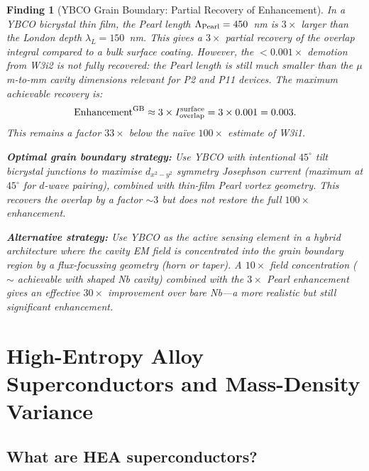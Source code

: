 \documentclass[11pt]{article}
\newtheorem{finding}{Finding}
\begin{document}
\begin{finding}[YBCO Grain Boundary: Partial Recovery of Enhancement]
\label{finding:GB}
In a YBCO bicrystal thin film, the Pearl length $\Lambda_{\rm Pearl} = 450$~nm
is $3\times$ larger than the London depth $\lambda_L = 150$~nm. This gives
a $3\times$ partial recovery of the overlap integral compared to a bulk surface
coating. However, the $<0.001\times$ demotion from W3i2 is not fully recovered:
the Pearl length is still much smaller than the $\mu$m-to-mm cavity dimensions
relevant for P2 and P11 devices. The maximum achievable recovery is:
\begin{equation}
\text{Enhancement}^{\rm GB} \approx 3 \times I_{\rm overlap}^{\rm surface}
= 3 \times 0.001 = 0.003.
\end{equation}
This remains a factor $33\times$ below the na\"ive $100\times$ estimate of W3i1.

\textbf{Optimal grain boundary strategy:} Use YBCO with intentional $45^\circ$
tilt bicrystal junctions to maximise $d_{x^2-y^2}$ symmetry Josephson
current (maximum at $45^\circ$ for $d$-wave pairing), combined with
thin-film Pearl vortex geometry. This recovers the overlap by a factor
$\sim 3$ but does not restore the full $100\times$ enhancement.

\textbf{Alternative strategy:} Use YBCO as the active sensing element in
a hybrid architecture where the cavity EM field is \emph{concentrated} into
the grain boundary region by a flux-focussing geometry (horn or taper).
A $10\times$ field concentration ($\sim$ achievable with shaped Nb cavity)
combined with the $3\times$ Pearl enhancement gives an effective
$30\times$ improvement over bare Nb---a more realistic but still significant
enhancement.
\end{finding}

\section{High-Entropy Alloy Superconductors and Mass-Density Variance}
\label{sec:HEA}

\subsection{What are HEA superconductors?}
\end{document}
